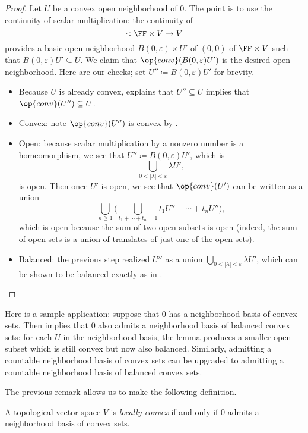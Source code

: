\documentclass[notes.tex]{subfiles}
\begin{document}
\begin{proof}
	Let $U$ be a convex open neighborhood of $0$. The point is to use the continuity of scalar multiplication: the continuity of
	\[\cdot\colon\FF\times V\to V\]
	provides a basic open neighborhood $B(0,\varepsilon)\times U'$ of $(0,0)$ of $\FF\times V$ such that $B(0,\varepsilon)U'\subseteq U$. We claim that $\op{conv}(B(0,\varepsilon)U')$ is the desired open neighborhood. Here are our checks; set $U''\coloneqq B(0,\varepsilon)U'$ for brevity.
	\begin{itemize}
		\item Because $U$ is already convex,  explains that $U''\subseteq U$ implies that $\op{conv}(U'')\subseteq U$.
		\item Convex: note $\op{conv}(U'')$ is convex by .
		\item Open: because scalar multiplication by a nonzero number is a homeomorphism, we see that $U''\coloneqq B(0,\varepsilon)U'$, which is
		\[\bigcup_{0<\left|\lambda\right|<\varepsilon}\lambda U',\]
		is open. Then once $U'$ is open, we see that $\op{conv}(U')$ can be written as a union
		\[\bigcup_{n\ge1}\Bigg(\bigcup_{t_1+\cdots+t_n=1}t_1U''+\cdots+t_nU''\Bigg),\]
		which is open because the sum of two open subsets is open (indeed, the sum of open sets is a union of translates of just one of the open sets).
		\item Balanced: the previous step realized $U''$ as a union $\bigcup_{0<\left|\lambda\right|<\varepsilon}\lambda U'$, which can be shown to be balanced exactly as in .
		\qedhere
	\end{itemize}
\end{proof}
\begin{remark} \label{rem:balanced-convex-basis}
	Here is a sample application: suppose that $0$ has a neighborhood basis of convex sets. Then  implies that $0$ also admits a neighborhood basis of balanced convex sets: for each $U$ in the neighborhood basis, the lemma produces a smaller open subset which is still convex but now also balanced. Similarly, admitting a countable neighborhood basis of convex sets can be upgraded to admitting a countable neighborhood basis of balanced convex sets.
\end{remark}
The previous remark allows us to make the following definition.
\begin{definition}
	A topological vector space $V$ is \textit{locally convex} if and only if $0$ admits a neighborhood basis of convex sets.
\end{definition}
\end{document}
